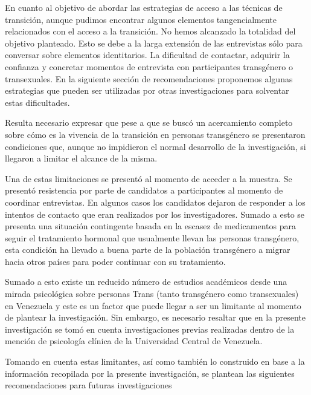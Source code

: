 En cuanto al objetivo de abordar las estrategias de acceso a las técnicas de
transición, aunque pudimos encontrar algunos elementos tangencialmente
relacionados con el acceso a la transición. No hemos alcanzado la totalidad del
objetivo planteado. Esto se debe a la larga extensión de las entrevistas sólo
para conversar sobre elementos identitarios. La dificultad de contactar,
adquirir la confianza y concretar momentos de entrevista con participantes
transgénero o transexuales. En la siguiente sección de recomendaciones
proponemos algunas estrategias que pueden ser utilizadas por otras
investigaciones para solventar estas dificultades.

Resulta necesario expresar que pese a que se buscó un acercamiento completo
sobre cómo es la vivencia de la transición en personas transgénero se
presentaron condiciones que, aunque no impidieron el normal desarrollo de la
investigación, si llegaron a limitar el alcance de la misma.

Una de estas limitaciones se presentó al momento de acceder a la muestra. Se
presentó resistencia por parte de candidatos a participantes al momento de
coordinar entrevistas. En algunos casos los candidatos dejaron de responder a
los intentos de contacto que eran realizados por los investigadores. Sumado a
esto se presenta una situación contingente basada en la escasez de medicamentos
para seguir el tratamiento hormonal que usualmente llevan las personas
transgénero, esta condición ha llevado a buena parte de la población transgénero
a migrar hacia otros países para poder continuar con su tratamiento.

Sumado a esto existe un reducido número de estudios académicos desde una mirada
psicológica sobre personas Trans (tanto transgénero como transexuales) en
Venezuela y este es un factor que puede llegar a ser un limitante al momento de
plantear la investigación. Sin embargo, es necesario resaltar que en la presente
investigación se tomó en cuenta investigaciones previas realizadas dentro de
la mención de psicología clínica de la Universidad Central de Venezuela.

Tomando en cuenta estas limitantes, así como también lo construido en base a la
información recopilada por la presente investigación, se plantean las siguientes
recomendaciones para futuras investigaciones

